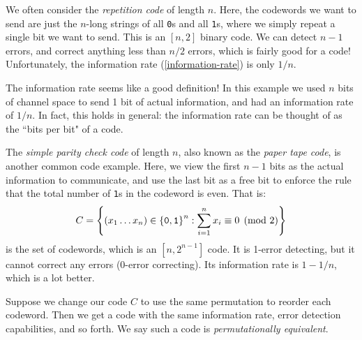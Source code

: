 \documentclass{article}
\begin{document}
We often consider the \textit{repetition code} of length $n$. Here, the codewords we want to send are just the $n$-long strings of all \texttt{0}s and all \texttt{1}s, where we simply repeat a single bit we want to send. This is an $[n, 2]$ binary code. We can detect $n-1$ errors, and correct anything less than $n/2$ errors, which is fairly good for a code! Unfortunately, the information rate (\ref{information-rate}) is only $1/n$.

\begin{note}
	The information rate seems like a good definition! In this example we used $n$ bits of channel space to send 1 bit of actual information, and had an information rate of $1/n$. In fact, this holds in general: the information rate can be thought of as the ``bits per bit" of a code.
\end{note}

\begin{example}
    The \textit{simple parity check code} of length $n$, also known as the \textit{paper tape code}, is another common code example. Here, we view the first $n-1$ bits as the actual information to communicate, and use the last bit as a free bit to enforce the rule that the total number of \texttt{1}s in the codeword is even. That is:
    \[
	C = \left\lbrace (x_1 \dots x_n) \in \left\lbrace \texttt{0}, \texttt{1} \right\rbrace^n : \sum_{i=1}^n x_i \equiv 0 \pmod 2 \right\rbrace
	\]
	is the set of codewords, which is an $[n, 2^{n-1}]$ code. It is 1-error detecting, but it cannot correct any errors (0-error correcting). Its information rate is $1- 1/n$, which is a lot better.
\end{example}

\begin{note}
	Suppose we change our code $C$ to use the same permutation to reorder each codeword. Then we get a code with the same information rate, error detection capabilities, and so forth. We say such a code is \textit{permutationally equivalent}.
\end{note}
\end{document}
